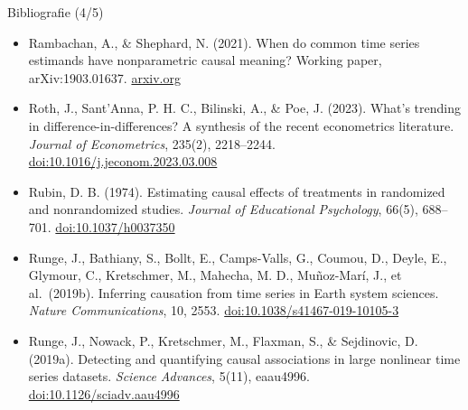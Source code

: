 \begin{frame}{Bibliografie (4/5)}
\begin{itemize}
    \item Rambachan, A., \& Shephard, N. (2021). When do common time series estimands have nonparametric causal meaning? Working paper, arXiv:1903.01637. \href{https://arxiv.org/abs/1903.01637}{arxiv.org}
    \item Roth, J., Sant’Anna, P. H. C., Bilinski, A., \& Poe, J. (2023). What’s trending in difference-in-differences? A synthesis of the recent econometrics literature. \textit{Journal of Econometrics}, 235(2), 2218--2244. \href{https://doi.org/10.1016/j.jeconom.2023.03.008}{doi:10.1016/j.jeconom.2023.03.008}
    \item Rubin, D. B. (1974). Estimating causal effects of treatments in randomized and nonrandomized studies. \textit{Journal of Educational Psychology}, 66(5), 688--701. \href{https://doi.org/10.1037/h0037350}{doi:10.1037/h0037350}
    \item Runge, J., Bathiany, S., Bollt, E., Camps-Valls, G., Coumou, D., Deyle, E., Glymour, C., Kretschmer, M., Mahecha, M. D., Muñoz-Marí, J., et al.\ (2019b). Inferring causation from time series in Earth system sciences. \textit{Nature Communications}, 10, 2553. \href{https://doi.org/10.1038/s41467-019-10105-3}{doi:10.1038/s41467-019-10105-3}
    \item Runge, J., Nowack, P., Kretschmer, M., Flaxman, S., \& Sejdinovic, D. (2019a). Detecting and quantifying causal associations in large nonlinear time series datasets. \textit{Science Advances}, 5(11), eaau4996. \href{https://doi.org/10.1126/sciadv.aau4996}{doi:10.1126/sciadv.aau4996}
\end{itemize}
\end{frame}

